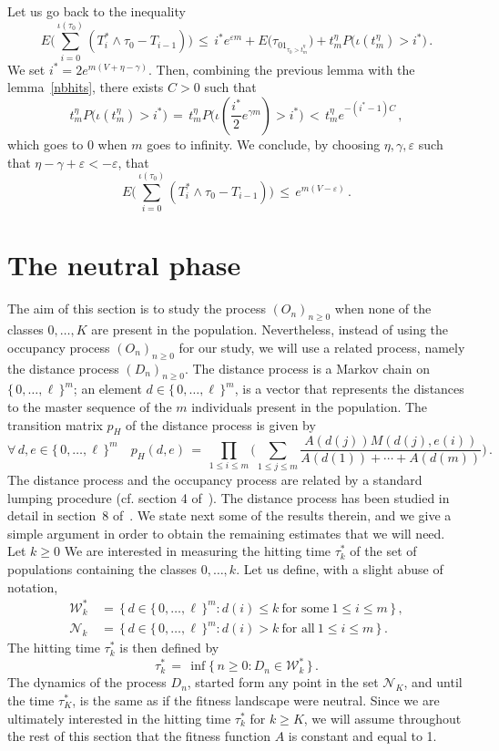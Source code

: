 \documentclass[a4paper,12pt]{article}
\theoremstyle{definition}
\theoremstyle{remark}
\def \cN {\mathcal{N}}
\def \cW {\mathcal{W}}
\def \g {\gamma}
\def \e {\varepsilon}
\def \zl {\{\, 0,\dots,\ell \,\}}
\def \cW {{\mathcal W}^*}
\begin{document}
Let us go back to the inequality
$$E\bigg(
\sum_{i=0}^{\iota(\tau_0)}(T_i^*\wedge\tau_0-T_{i-1})
\bigg)\,\leq\,i^*e^{\e m}+ E\big(
\tau_01_{\tau_0>t^{\eta}_m}
\big)+t^\eta_mP\big(
\iota(t^\eta_m)>i^*
\big)\,.$$
We set $i^*=2 e^{m(V+\eta-\g)}$.
Then, combining the previous lemma with the lemma~\ref{nbhits}, there exists $C>0$ such that
$$t^\eta_m
P\big(
\iota(t^\eta_m)>i^*
\big)\,=\,t^\eta_m P\big(
\iota(\frac{i^*}{2}e^{\g m})>i^*
\big)\,<\,t^\eta_me^{-(i^*-1)C}\,,$$
which goes to $0$ when $m$ goes to infinity.
We conclude, by choosing $\eta,\g,\e$ such that $\eta-\gamma+\e<-\e$, that
$$
E\bigg(
\sum_{i=0}^{\iota(\tau_0)}(T_i^*\wedge\tau_0-T_{i-1})
\bigg)\,\leq\,
e^{m(V-\e)}\,.
$$
\section{The neutral phase}\label{nphase}
The aim of this section is to study the process $(O_n)_{n\geq0}$
when none of the classes $0,\dots,K$ are present in the population.
Nevertheless, instead of using the occupancy process $(O_n)_{n\geq0}$
for our study, we will use a related process, namely the distance process $(D_n)_{n\geq0}$.
The distance process is a Markov chain on $\zl^m$; an element $d\in\zl^m$, is a vector that
represents the distances to the master sequence of the $m$ individuals present in the population.
The transition matrix $p_H$ of the distance process is given by
$$\forall\,d,e\in\zl^m\quad
p_H(d,e)\,=\,\prod_{1\leq i\leq m}\bigg(
\sum_{1\leq j\leq m}\frac{A(d(j))M(d(j),e(i))}{A(d(1))+\cdots+A(d(m))}
\bigg)\,.$$
The distance process and the occupancy process are related by a standard lumping procedure (cf. section 4 of~\cite{CerfWF}).
The distance process has been studied in detail in section~8 of~\cite{CerfWF}.
We state next some of the results therein, and we give a simple argument 
in order to obtain the remaining estimates that we will need.
Let $k\geq0$
We are interested in measuring the hitting time $\tau^*_k$ 
of the set of populations containing the classes $0,\dots,k$.
Let us define, with a slight abuse of notation,
\begin{align*}
\cW_k\,&=\,\big\lbrace\,
d\in\zl^m:d(i)\leq k\ \text{for some}\ 1\leq i\leq m
\,\big\rbrace\,,\\
	\cN_k\,&=\,\big\lbrace\,
d\in\zl^m:d(i)>k\ \text{for all}\ 1\leq i\leq m
\,\big\rbrace\,.
\end{align*}
The hitting time $\tau^*_k$ is then defined by
$$\tau^*_k\,=\,\inf\big\lbrace\,
n\geq0:D_n\in\cW_k
\,\big\rbrace\,.$$
The dynamics of the process $D_n$, started form any point in the set $\cN_K$,
and until the time $\tau^*_K$, is the same as if the fitness landscape were neutral.
Since we are ultimately interested in the hitting time $\tau^*_k$
for $k\geq K$, we will assume throughout the rest of this section that the 
fitness function $A$ is constant and equal to 1.
\end{document}
